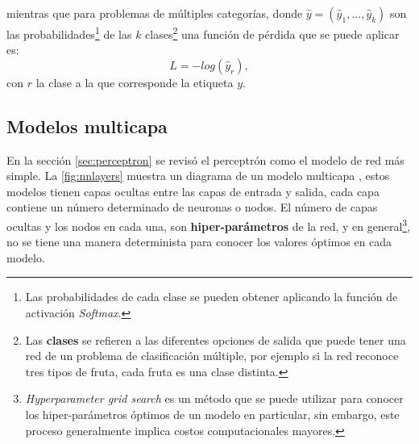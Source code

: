 \noindent mientras que para problemas de múltiples categorías, donde $\hat{y}=(\hat{y}_1, ..., \hat{y}_k)$ son las probabilidades\footnote{Las probabilidades de cada clase se pueden obtener aplicando la función de activación \emph{Softmax}.} de las $k$ clases\footnote{Las \textbf{clases} se refieren a las diferentes opciones de salida que puede tener una red de un problema de clasificación múltiple, por ejemplo si la red reconoce tres tipos de fruta, cada fruta es una clase distinta.} una función de pérdida que se puede aplicar es:
\begin{equation}
  \label{eq:otro}
  L = −log(\hat{y}_r),
\end{equation}
con $r$ la clase a la que corresponde la etiqueta $y$.

\subsection{Modelos multicapa}\label{sec:multicapamodels}
En la sección \autoref{sec:perceptron} se revisó el perceptrón como el modelo de red más simple. La \autoref{fig:nnlayers} muestra un diagrama de un modelo multicapa \cite{Minsky2017}, estos modelos tienen capas ocultas entre las capas de entrada y salida, cada capa contiene un número determinado de neuronas o nodos. El número de capas ocultas y los nodos en cada una, son \textbf{hiper-parámetros} de la red, y en general\footnote{\emph{Hyperparameter grid search} \cite{GSearch2019} es un método que se puede utilizar para conocer los hiper-parámetros óptimos de un modelo en particular, sin embargo, este proceso generalmente implica costos computacionales mayores.}, no se tiene una manera determinista para conocer los valores óptimos en cada modelo.

